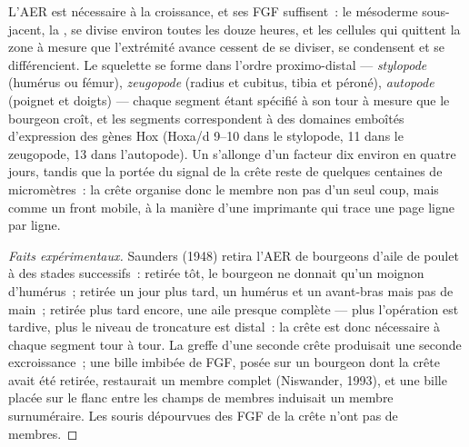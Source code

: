 \begin{proposition}\label{prop:b2:limb-organogenesis:aer}
L'AER est nécessaire à la croissance, et ses FGF suffisent~: le
mésoderme sous-jacent, la \emph{}, se divise environ
toutes les douze heures, et les cellules qui quittent la zone à mesure
que l'extrémité avance cessent de se diviser, se condensent et se
différencient. Le squelette se forme dans l'ordre proximo-distal ---
\emph{stylopode} (humérus ou fémur), \emph{zeugopode} (radius et
cubitus, tibia et péroné), \emph{autopode} (poignet et doigts) ---
chaque segment étant spécifié à son tour à mesure que le bourgeon croît,
et les segments correspondent à des domaines emboîtés d'expression des
gènes Hox (Hoxa/d 9--10 dans le stylopode, 11 dans le zeugopode, 13 dans
l'autopode). Un  s'allonge d'un facteur dix environ en
quatre jours, tandis que la portée du signal de la crête reste de
quelques centaines de micromètres~: la crête organise donc le membre
non pas d'un seul coup, mais comme un front mobile, à la manière d'une
imprimante qui trace une page ligne par ligne.
\end{proposition}
\begin{proof}[Faits expérimentaux]
Saunders (1948) retira l'AER de bourgeons d'aile de poulet à des stades
successifs~: retirée tôt, le bourgeon ne donnait qu'un moignon
d'humérus~; retirée un jour plus tard, un humérus et un avant-bras mais
pas de main~; retirée plus tard encore, une aile presque complète ---
plus l'opération est tardive, plus le niveau de troncature est distal~:
la crête est donc nécessaire à chaque segment tour à tour. La greffe
d'une seconde crête produisait une seconde excroissance~; une bille
imbibée de FGF, posée sur un bourgeon dont la crête avait été retirée,
restaurait un membre complet (Niswander, 1993), et une bille placée sur
le flanc entre les champs de membres induisait un membre surnuméraire.
Les souris dépourvues des FGF de la crête n'ont pas de membres.
\end{proof}

